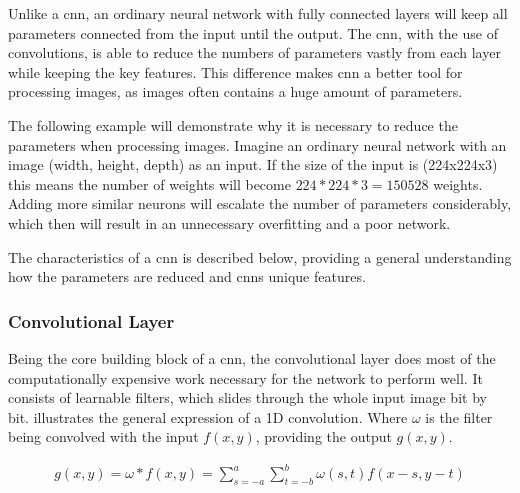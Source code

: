 \documentclass[USenglish]{ifimaster}  %
\begin{document}
Unlike a \ac{cnn}, an ordinary neural network with fully connected layers will keep all parameters connected from the input until the output. The \ac{cnn}, with the use of convolutions, is able to reduce the numbers of parameters vastly from each layer while keeping the key features. This difference makes \ac{cnn} a better tool for processing images, as images often contains a huge amount of parameters. 

The following example will demonstrate why it is necessary to reduce the parameters when processing images. Imagine an ordinary neural network with an image (width, height, depth) as an input. If the size of the input is (224x224x3) this means the number of weights will become $224 * 224 * 3 = 150528$ weights. Adding more similar neurons will escalate the number of parameters considerably, which then will result in an unnecessary overfitting and a poor network.

The characteristics of a \ac{cnn} is described below, providing a general understanding how the parameters are reduced and \acp{cnn} unique features.

\subsubsection{Convolutional Layer}
Being the core building block of a \ac{cnn}, the convolutional layer does most of the computationally expensive work necessary for the network to perform well. It consists of learnable filters, which slides through the whole input image bit by bit.  illustrates the general expression of a 1D convolution. Where $\omega$ is the filter being convolved with the input $f(x,y)$, providing the output $g(x,y)$. 

\begin{equation}\label{eq:conv}
\begin{aligned}
g(x,y) = \omega * f(x,y) = \sum_{s=-a}^{a}\sum_{t=-b}^{b}\omega(s,t)f(x-s,y-t)
\end{aligned}
\end{equation}
\end{document}

